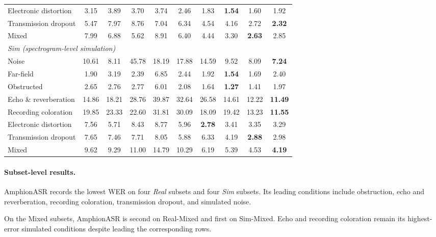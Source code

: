 \begin{table}[t]
\begin{tabular}{l@{\hspace{3pt}}ccccccccc}
    Electronic distortion  & 3.15  & 3.89  & 3.70  & 3.74  & 2.46  & 1.83  & \textbf{1.54} & 1.60  & 1.92 \\
    Transmission dropout   & 5.47  & 7.97  & 8.76  & 7.04  & 6.34  & 4.54  & 4.16  & 2.72  & \textbf{2.32} \\
    Mixed                  & 7.99  & 6.88  & 5.62  & 8.91  & 6.40  & 4.44  & 3.30  & \textbf{2.63} & 2.85 \\
    \midrule
    \multicolumn{10}{l}{\emph{Sim (spectrogram-level simulation)}} \\
    \midrule
    Noise                  & 10.61 & 8.11  & 45.78 & 18.19 & 17.88 & 14.59 & 9.52  & 8.09  & \textbf{7.24} \\
    Far-field              & 1.90  & 3.19  & 2.39  & 6.85  & 2.44  & 1.92  & \textbf{1.54} & 1.69  & 2.40 \\
    Obstructed             & 2.65  & 2.76  & 2.77  & 6.01  & 2.08  & 1.64  & \textbf{1.27} & 1.41  & 1.97 \\
    Echo \& reverberation  & 14.86 & 18.21 & 28.76 & 39.87 & 32.64 & 26.58 & 14.61 & 12.22 & \textbf{11.49} \\
    Recording coloration   & 19.85 & 23.33 & 22.60 & 31.81 & 30.09 & 18.09 & 19.42 & 13.23 & \textbf{11.55} \\
    Electronic distortion  & 7.56  & 5.71  & 8.43  & 8.77  & 5.96  & \textbf{2.78} & 3.41  & 3.35  & 3.29 \\
    Transmission dropout   & 7.65  & 7.46  & 7.71  & 8.05  & 5.88  & 6.33  & 4.19  & \textbf{2.88} & 2.98 \\
    Mixed                  & 9.62  & 9.29  & 11.00 & 14.79 & 10.29 & 6.19  & 5.39  & 4.53  & \textbf{4.19} \\
    \bottomrule
  \end{tabular}
\end{table}

\paragraph{Subset-level results.}
AmphionASR records the lowest WER on four \emph{Real} subsets and four
\emph{Sim} subsets.
Its leading conditions include obstruction, echo and reverberation,
recording coloration, transmission dropout, and simulated noise.

On the Mixed subsets, AmphionASR is second on Real-Mixed and first on
Sim-Mixed.
Echo and recording coloration remain its highest-error simulated
conditions despite leading the corresponding rows.
